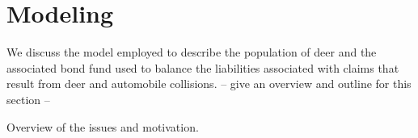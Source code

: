 

\section{Modeling}

We discuss the model employed to describe the population of deer and
the associated bond fund used to balance the liabilities associated
with claims that result from deer and automobile collisions. -- give
an overview and outline for this section --

Overview of the issues and motivation.




